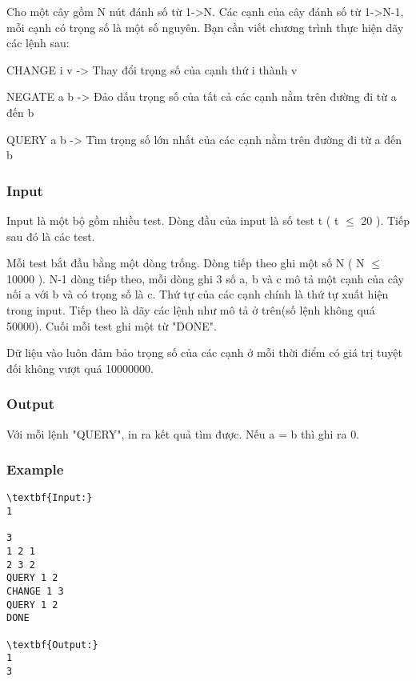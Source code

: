 



   Cho một cây gồm N nút đánh số từ 1->N. Các cạnh của cây đánh số từ 1->N-1, mỗi cạnh có trọng số là một số nguyên. Bạn cần viết chương trình thực hiện dãy các lệnh sau:   


   CHANGE i v -> Thay đổi trọng số của cạnh thứ i thành v   


   NEGATE a b -> Đảo dấu trọng số của tất cả các cạnh nằm trên đường đi từ a đến b   


   QUERY a b -> Tìm trọng số lớn nhất của các cạnh nằm trên đường đi từ a đến b  

\subsubsection{   Input  }

   Input là một bộ gồm nhiều test. Dòng đầu của input là số test t ( t $\le$ 20 ). Tiếp sau đó là các test.   


   Mỗi test bắt đầu bằng một dòng trống. Dòng tiếp theo ghi một số N ( N $\le$ 10000 ). N-1 dòng tiếp theo, mỗi dòng ghi 3 số a, b và c mô tả một cạnh của cây nối a với b và có trọng số là c. Thứ tự của các cạnh chính là thứ tự xuất hiện trong input. Tiếp theo là dãy các lệnh như mô tả ở trên(số lệnh không quá 50000). Cuối mỗi test ghi một từ "DONE".   


   Dữ liệu vào luôn đảm bảo trọng số của các cạnh ở mỗi thời điểm có giá trị tuyệt đối không vượt quá 10000000.  

\subsubsection{   Output  }

   Với mỗi lệnh "QUERY", in ra kết quả tìm được. Nếu a = b  thì ghi ra 0.  

\subsubsection{   Example  }
\begin{verbatim}
\textbf{Input:}
1

3
1 2 1
2 3 2
QUERY 1 2
CHANGE 1 3
QUERY 1 2
DONE

\textbf{Output:}
1
3
\end{verbatim}

